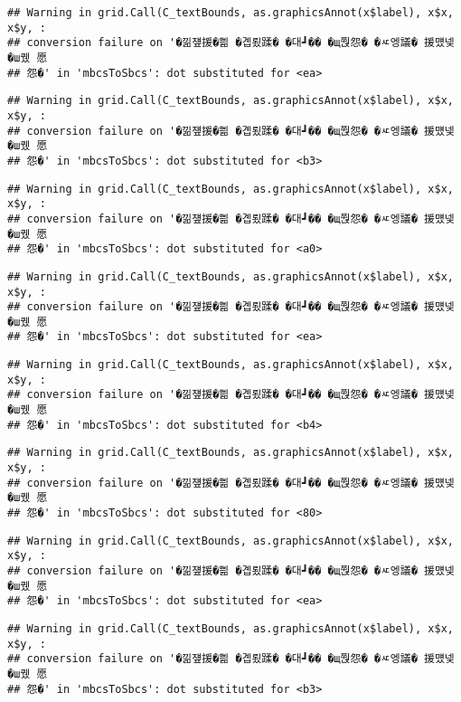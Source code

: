 \documentclass[
]{article}
\begin{document}
\begin{verbatim}
## Warning in grid.Call(C_textBounds, as.graphicsAnnot(x$label), x$x, x$y, :
## conversion failure on '�낆쟾援�쁾 �곕룄蹂� �대┛�� �щ쭩怨� �ㅼ엥議� 援먰넻�ш퀬 愿
## 怨�' in 'mbcsToSbcs': dot substituted for <ea>
\end{verbatim}

\begin{verbatim}
## Warning in grid.Call(C_textBounds, as.graphicsAnnot(x$label), x$x, x$y, :
## conversion failure on '�낆쟾援�쁾 �곕룄蹂� �대┛�� �щ쭩怨� �ㅼ엥議� 援먰넻�ш퀬 愿
## 怨�' in 'mbcsToSbcs': dot substituted for <b3>
\end{verbatim}

\begin{verbatim}
## Warning in grid.Call(C_textBounds, as.graphicsAnnot(x$label), x$x, x$y, :
## conversion failure on '�낆쟾援�쁾 �곕룄蹂� �대┛�� �щ쭩怨� �ㅼ엥議� 援먰넻�ш퀬 愿
## 怨�' in 'mbcsToSbcs': dot substituted for <a0>
\end{verbatim}

\begin{verbatim}
## Warning in grid.Call(C_textBounds, as.graphicsAnnot(x$label), x$x, x$y, :
## conversion failure on '�낆쟾援�쁾 �곕룄蹂� �대┛�� �щ쭩怨� �ㅼ엥議� 援먰넻�ш퀬 愿
## 怨�' in 'mbcsToSbcs': dot substituted for <ea>
\end{verbatim}

\begin{verbatim}
## Warning in grid.Call(C_textBounds, as.graphicsAnnot(x$label), x$x, x$y, :
## conversion failure on '�낆쟾援�쁾 �곕룄蹂� �대┛�� �щ쭩怨� �ㅼ엥議� 援먰넻�ш퀬 愿
## 怨�' in 'mbcsToSbcs': dot substituted for <b4>
\end{verbatim}

\begin{verbatim}
## Warning in grid.Call(C_textBounds, as.graphicsAnnot(x$label), x$x, x$y, :
## conversion failure on '�낆쟾援�쁾 �곕룄蹂� �대┛�� �щ쭩怨� �ㅼ엥議� 援먰넻�ш퀬 愿
## 怨�' in 'mbcsToSbcs': dot substituted for <80>
\end{verbatim}

\begin{verbatim}
## Warning in grid.Call(C_textBounds, as.graphicsAnnot(x$label), x$x, x$y, :
## conversion failure on '�낆쟾援�쁾 �곕룄蹂� �대┛�� �щ쭩怨� �ㅼ엥議� 援먰넻�ш퀬 愿
## 怨�' in 'mbcsToSbcs': dot substituted for <ea>
\end{verbatim}

\begin{verbatim}
## Warning in grid.Call(C_textBounds, as.graphicsAnnot(x$label), x$x, x$y, :
## conversion failure on '�낆쟾援�쁾 �곕룄蹂� �대┛�� �щ쭩怨� �ㅼ엥議� 援먰넻�ш퀬 愿
## 怨�' in 'mbcsToSbcs': dot substituted for <b3>
\end{verbatim}
\end{document}
